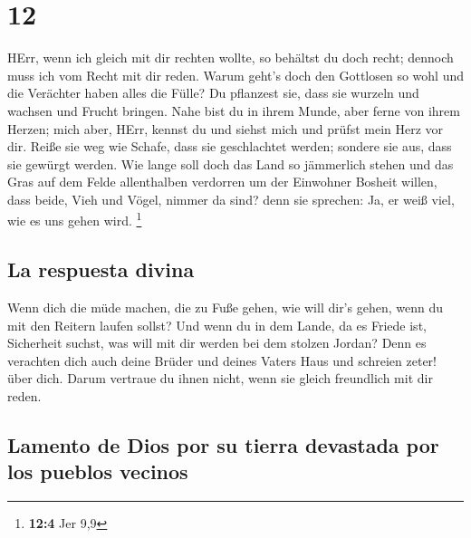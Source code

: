 \hypertarget{section-11}{%
\section{12}\label{section-11}}

 HErr, wenn ich gleich mit dir rechten wollte, so behältst
du doch recht; dennoch muss ich vom Recht mit dir reden. Warum geht's
doch den Gottlosen so wohl und die Verächter haben alles die Fülle?
 Du pflanzest sie, dass sie wurzeln und wachsen und Frucht
bringen. Nahe bist du in ihrem Munde, aber ferne von ihrem Herzen;
 mich aber, HErr, kennst du und siehst mich und prüfst
mein Herz vor dir. Reiße sie weg wie Schafe, dass sie geschlachtet
werden; sondere sie aus, dass sie gewürgt werden.  Wie
lange soll doch das Land so jämmerlich stehen und das Gras auf dem Felde
allenthalben verdorren um der Einwohner Bosheit willen, dass beide, Vieh
und Vögel, nimmer da sind? denn sie sprechen: Ja, er weiß viel, wie es
uns gehen wird. \footnote{\textbf{12:4} Jer 9,9}

\hypertarget{la-respuesta-divina}{%
\subsection{La respuesta divina}\label{la-respuesta-divina}}

 Wenn dich die müde machen, die zu Fuße gehen, wie will
dir's gehen, wenn du mit den Reitern laufen sollst? Und wenn du in dem
Lande, da es Friede ist, Sicherheit suchst, was will mit dir werden bei
dem stolzen Jordan?  Denn es verachten dich auch deine
Brüder und deines Vaters Haus und schreien zeter! über dich. Darum
vertraue du ihnen nicht, wenn sie gleich freundlich mit dir reden.

\hypertarget{lamento-de-dios-por-su-tierra-devastada-por-los-pueblos-vecinos}{%
\subsection{Lamento de Dios por su tierra devastada por los pueblos
vecinos}\label{lamento-de-dios-por-su-tierra-devastada-por-los-pueblos-vecinos}}

